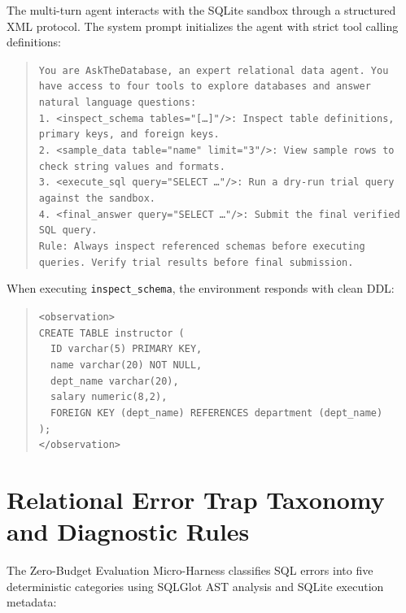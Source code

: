 \documentclass{article}
\theoremstyle{plain}
\theoremstyle{definition}
\theoremstyle{remark}
\begin{document}
The multi-turn agent interacts with the SQLite sandbox through a structured XML protocol. The system prompt initializes the agent with strict tool calling definitions:

\begin{quote}
\small
\texttt{You are AskTheDatabase, an expert relational data agent. You have access to four tools to explore databases and answer natural language questions:}\\
\texttt{1. <inspect\_schema tables="[\dots]"/>: Inspect table definitions, primary keys, and foreign keys.}\\
\texttt{2. <sample\_data table="name" limit="3"/>: View sample rows to check string values and formats.}\\
\texttt{3. <execute\_sql query="SELECT \dots"/>: Run a dry-run trial query against the sandbox.}\\
\texttt{4. <final\_answer query="SELECT \dots"/>: Submit the final verified SQL query.}\\
\texttt{Rule: Always inspect referenced schemas before executing queries. Verify trial results before final submission.}
\end{quote}

When executing \texttt{inspect\_schema}, the environment responds with clean DDL:
\begin{quote}
\small
\texttt{<observation>}\\
\texttt{CREATE TABLE instructor (}\\
\texttt{\ \ ID varchar(5) PRIMARY KEY,}\\
\texttt{\ \ name varchar(20) NOT NULL,}\\
\texttt{\ \ dept\_name varchar(20),}\\
\texttt{\ \ salary numeric(8,2),}\\
\texttt{\ \ FOREIGN KEY (dept\_name) REFERENCES department (dept\_name)}\\
\texttt{);}\\
\texttt{</observation>}
\end{quote}

\section{Relational Error Trap Taxonomy and Diagnostic Rules}
\label{sec:appendix_error_taxonomy}

The Zero-Budget Evaluation Micro-Harness classifies SQL errors into five deterministic categories using SQLGlot AST analysis and SQLite execution metadata:
\end{document}

